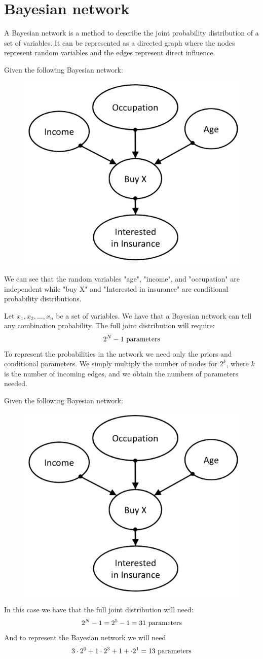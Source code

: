 \documentclass[12pt, a4paper]{report}
\newtheorem[style=M,bodystyle=\normalfont]{theorem}{Theorem}
\newtheorem[style=M,bodystyle=\normalfont]{corollary}{Corollary}
\newtheorem[style=M,bodystyle=\normalfont]{lemma}{Lemma}
\newtheorem[style=M,bodystyle=\normalfont]{definition}{Definition}
\begin{document}
    \section{Bayesian network}
    A Bayesian network is a method to describe the joint probability distribution of a set of variables. It can be represented as a 
    directed graph where the nodes represent random variables and the edges represent direct influence. 
    \begin{example}
        Given the following Bayesian network:
        \begin{figure}[H]
            \centering
            \includegraphics[width=0.4\linewidth]{images/insurance.png}
        \end{figure}
        We can see that the random variables "age", "income", and "occupation" are independent while "buy X" and 
        "Interested in insurance" are conditional probability distributions. 
    \end{example}
    Let $x_1,x_2,\dots,x_n$ be a set of variables. We have that a Bayesian network can tell any combination probability. The full joint 
    distribution will require: 
    \[2^N-1 \textnormal{ parameters}\] 
    To represent the probabilities in the network we need only the priors and conditional parameters. We simply multiply the number of
    nodes for $2^k$, where $k$ is the number of incoming edges, and we obtain the numbers of parameters needed. 
    \begin{example}
        Given the following Bayesian network:
        \begin{figure}[H]
            \centering
            \includegraphics[width=0.4\linewidth]{images/insurance.png}
        \end{figure}
        In this case we have that the full joint distribution will need: 
        \[2^N-1=2^5-1=31 \textnormal{ parameters}\]
        And to represent the Bayesian network we will need 
        \[3 \cdot 2^0 + 1 \cdot 2^3 + 1+ \cdot 2^1 = 13 \textnormal{ parameters}\]
    \end{example}
\end{document}
